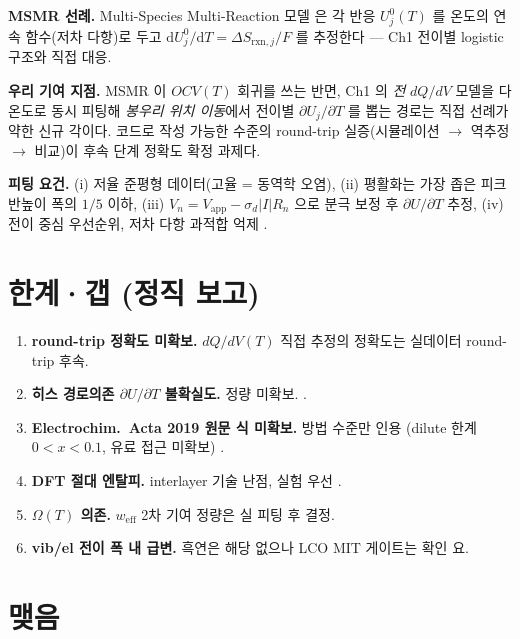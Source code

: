 \documentclass[11pt,a4paper]{article}
\newcommand{\dd}{\mathrm{d}}
\newcommand{\rxn}{\mathrm{rxn}}
\newcommand{\eff}{\mathrm{eff}}
\begin{document}
\textbf{MSMR 선례.} Multi-Species Multi-Reaction 모델 \cite{msmr_partI,msmr_partII} 은
각 반응 $U_j^0(T)$ 를 온도의 연속 함수(저차 다항)로 두고
$\dd U_j^0/\dd T = \Delta S_{\rxn,j}/F$ 를 추정한다 — Ch1 전이별 logistic 구조와 직접 대응.

\textbf{우리 기여 지점.} MSMR 이 $OCV(T)$ 회귀를 쓰는 반면,
Ch1 의 \emph{전} $dQ/dV$ 모델을 다온도로 동시 피팅해 \emph{봉우리 위치 이동}에서
전이별 $\partial U_j/\partial T$ 를 뽑는 경로는 직접 선례가 약한 신규 각이다.
코드로 작성 가능한 수준의 round-trip 실증(시뮬레이션 $\to$ 역추정 $\to$ 비교)이
후속 단계 정확도 확정 과제다.

\textbf{피팅 요건.} (i) 저율 준평형 데이터(고율 = 동역학 오염),
(ii) 평활화는 가장 좁은 피크 반높이 폭의 $1/5$ 이하,
(iii) $V_n = V_\mathrm{app} - \sigma_d|I|R_n$ 으로 분극 보정 후 $\partial U/\partial T$ 추정,
(iv) 전이 중심 우선순위, 저차 다항 과적합 억제 \cite{msmr_partI,msmr_partII}.

\section{한계·갭 (정직 보고)}\label{sec:gaps}

\begin{enumerate}[label=(\arabic*),leftmargin=1.6em,itemsep=3pt]
\item \textbf{round-trip 정확도 미확보.} $dQ/dV(T)$ 직접 추정의 정확도는 실데이터 round-trip 후속.
\item \textbf{히스 경로의존 $\partial U/\partial T$ 불확실도.} 정량 미확보. \cite{hysteresis2018}.
\item \textbf{Electrochim.\ Acta 2019 원문 식 미확보.} 방법 수준만 인용
  (dilute 한계 $0<x<0.1$, 유료 접근 미확보) \cite{occupation2019}.
\item \textbf{DFT 절대 엔탈피.} interlayer 기술 난점, 실험 우선 \cite{jpcc2021}.
\item \textbf{$\Omega(T)$ 의존.} $w_\eff$ 2차 기여 정량은 실 피팅 후 결정.
\item \textbf{vib/el 전이 폭 내 급변.} 흑연은 해당 없으나 LCO MIT 게이트는 확인 요.
\end{enumerate}

\section*{맺음}
\end{document}
